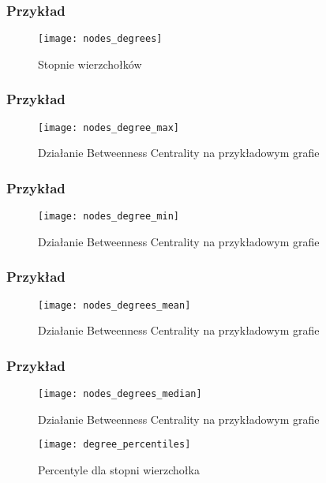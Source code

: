\FloatBarrier
\subsubsection{Przykład}
\begin{figure}[h]
	\centering
	\texttt{[image: nodes\_degrees]}
	\caption{Stopnie wierzchołków}
\end{figure}
\FloatBarrier\FloatBarrier
\subsubsection{Przykład}
\begin{figure}[h]
	\centering
	\texttt{[image: nodes\_degree\_max]}
	\caption{Działanie Betweenness Centrality  na przykładowym grafie}
\end{figure}
\FloatBarrier\FloatBarrier
\subsubsection{Przykład}
\begin{figure}[h]
	\centering
	\texttt{[image: nodes\_degree\_min]}
	\caption{Działanie Betweenness Centrality  na przykładowym grafie}
\end{figure}
\FloatBarrier\FloatBarrier
\subsubsection{Przykład}
\begin{figure}[h]
	\centering
	\texttt{[image: nodes\_degrees\_mean]}
	\caption{Działanie Betweenness Centrality  na przykładowym grafie}
\end{figure}
\FloatBarrier\FloatBarrier
\subsubsection{Przykład}
\begin{figure}[h]
	\centering
	\texttt{[image: nodes\_degrees\_median]}
	\caption{Działanie Betweenness Centrality  na przykładowym grafie}
\end{figure}
\FloatBarrier\FloatBarrier
\begin{figure}[h]
	\centering
	\texttt{[image: degree\_percentiles]}
	\caption{Percentyle dla stopni wierzchołka}
\end{figure}
\FloatBarrier\FloatBarrier